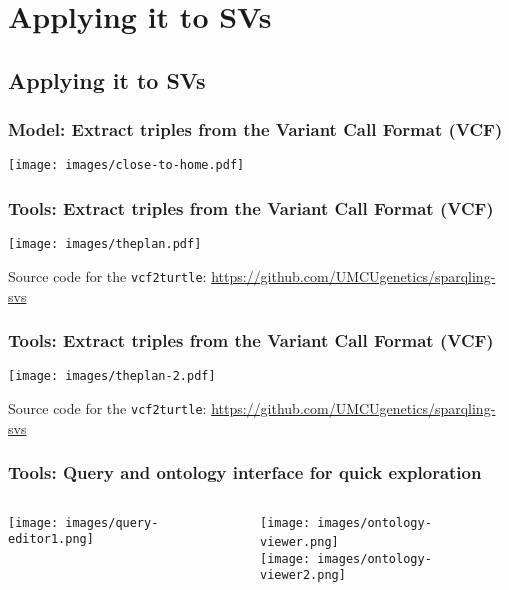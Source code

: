 \documentclass[11pt,aspectratio=169]{beamer} %
\begin{document}

\section{Applying it to SVs}

\subsection{Applying it to SVs}

\begin{frame}
  \frametitle{Model: Extract triples from the Variant Call Format (VCF)}
  \begin{center}
    \texttt{[image: images/close-to-home.pdf]}
  \end{center}
\end{frame}

\begin{frame}
  \frametitle{Tools: Extract triples from the Variant Call Format (VCF)}
  \begin{center}
    \texttt{[image: images/theplan.pdf]}
  \end{center}
  Source code for the \texttt{vcf2turtle}: \url{https://github.com/UMCUgenetics/sparqling-svs}
\end{frame}

\begin{frame}
  \frametitle{Tools: Extract triples from the Variant Call Format (VCF)}
  \begin{center}
    \texttt{[image: images/theplan-2.pdf]}
  \end{center}
  Source code for the \texttt{vcf2turtle}: \url{https://github.com/UMCUgenetics/sparqling-svs}
\end{frame}

\begin{frame}
  \frametitle{Tools: Query and ontology interface for quick exploration}
  \begin{columns}
    \begin{column}{0.48\textwidth}
      \texttt{[image: images/query-editor1.png]}
    \end{column}
    \begin{column}{0.48\textwidth}
      \begin{center}
        \texttt{[image: images/ontology-viewer.png]}~\\
        \texttt{[image: images/ontology-viewer2.png]}
        \end{center}
    \end{column}
\end{columns}
\end{frame}
\end{document}
